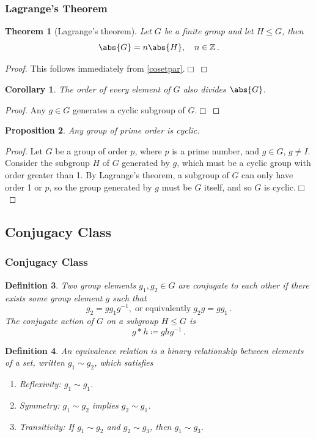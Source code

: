 \documentclass{article}
\theoremstyle{plain}\theoremheaderfont{\normalfont\itshape}\theorembodyfont{\rmfamily}\theoremseparator{.}\newtheorem*{rem}{Remark}\newtheorem*{ex}{Example}\newtheorem*{proof}{Proof}\newtheorem*{altp}{Alternative proof}
\theoremstyle{plain}\theoremheaderfont{\normalfont\bfseries}\theorembodyfont{\rmfamily}\theoremseparator{.}\newtheorem{thm}{Theorem}[section]\newtheorem{lem}[thm]{Lemma}\newtheorem{prop}[thm]{Proposition}\newtheorem*{cor}{Corollary}\newtheorem{defn}[thm]{Definition}\newtheorem{clm}[thm]{Claim}\newtheorem{clminproof}{Claim}
\theoremstyle{break}\theoremheaderfont{\normalfont\itshape}\theorembodyfont{\rmfamily}\theoremseparator{.\medskip}\newtheorem*{proofskip}{Proof}\newtheorem*{exs}{Examples}\newtheorem*{rems}{Remarks}
\theoremstyle{break}\theoremheaderfont{\normalfont\bfseries}\theorembodyfont{\rmfamily}\theoremseparator{.\medskip}\newtheorem{lemskip}[thm]{Lemma}\newtheorem{defnskip}[thm]{Definition}\newtheorem{propskip}[thm]{Proposition}\newtheorem{thmskip}[thm]{Theorem}
\numberwithin{equation}{section}
\newcommand{\qed}{\hfill\ensuremath{\Box}}
\begin{document}
	\subsubsection{Lagrange's Theorem}
	\begin{thm}[Lagrange's theorem]	
		Let \(G\) be a finite group and let \(H\le G\), then
		\[\abs{G}=n\abs{H},\quad n\in\mathbb{Z}\,.\]
	\end{thm}
	\begin{proof}
		This follows immediately from \cref{cosetpar}.\qed
	\end{proof}
	\begin{cor}
		The order of every element of \(G\) also divides \(\abs{G}\).
	\end{cor}
	\begin{proof}
		Any \(g\in G\) generates a cyclic subgroup of \(G\).\qed
	\end{proof}
	\begin{prop}
		Any group of prime order is cyclic.
	\end{prop}
	\begin{proof}
		Let \(G\) be a group of order \(p\), where \(p\) is a prime number, and \(g\in G\), \(g\ne I\). Consider the subgroup \(H\) of \(G\) generated by \(g\), which must be a cyclic group with order greater than 1. By Lagrange's theorem, a subgroup of \(G\) can only have order 1 or \(p\), so the group generated by \(g\) must be \(G\) itself, and so \(G\) is cyclic.\qed
	\end{proof}
	\subsection{Conjugacy Class}
	\subsubsection{Conjugacy Class}
	\begin{defn}
		Two group elements \(g_1, g_2\in G\) are \textit{conjugate} to each other if there exists some group element \(g\) such that
		\[g_2=gg_1g^{-1},\;\text{or equivalently}\; g_2g=gg_1\,.\]
		The \textit{conjugate action} of \(G\) on a subgroup \(H\le G\) is
		\[g*h\coloneqq ghg^{-1}\,.\]
	\end{defn}
	\begin{defn}
		An \textit{equivalence relation} is a binary relationship between elements of a set, written \(g_1\sim g_2\), which satisfies
		\begin{enumerate}[topsep=0pt]
			\item \textit{Reflexivity}: \(g_1\sim g_1\).
			\item \textit{Symmetry}: \(g_1\sim g_2\) implies \(g_2\sim g_1\).
			\item \textit{Transitivity}: If \(g_1\sim g_2\) and \(g_2\sim g_3\), then \(g_1\sim g_3\).
		\end{enumerate}
	\end{defn}
	
\end{document}

